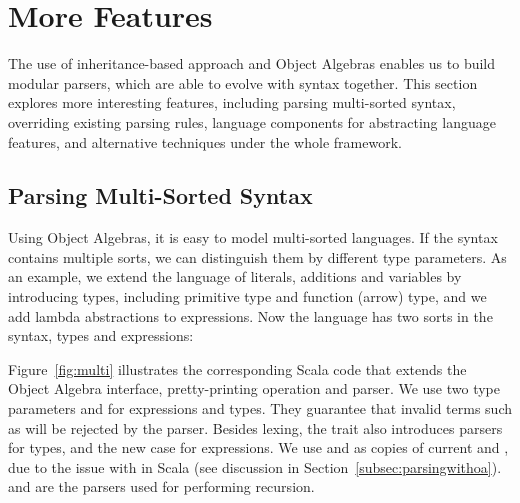 \section{More Features}

The use of inheritance-based approach and Object Algebras enables us
to build modular parsers, which are able to evolve with
syntax together. This section explores more interesting features, including
parsing multi-sorted syntax, overriding existing parsing rules,
language components for abstracting language features, and alternative
techniques under the whole framework.

\subsection{Parsing Multi-Sorted Syntax}\label{subsec:differentsyntax}

\begin{comment}
As illustrated above, using Object Algebras separates data structures from behaviors, thus enabling more modularity and reuse. New language constructs correspond to the new cases in the algebra. Different operations
 on structures, with both code reuse and separate compilation supported.
\end{comment}

Using Object Algebras, it is easy to
model multi-sorted languages. If the syntax contains multiple sorts, we can distinguish them by different type parameters. As an example, we extend the language of literals, additions and variables by introducing types, including primitive type  and function (arrow) type, and we add lambda abstractions to expressions. Now the language has two sorts in the syntax, types and expressions:\\


Figure~\ref{fig:multi} illustrates the corresponding Scala code
that extends the Object Algebra interface, pretty-printing operation and parser. We use two type parameters  and  for expressions and types. They guarantee that invalid terms such as  will be rejected by the parser.
Besides lexing, the trait  also introduces parsers for types, and the new case for expressions.
We use  and  as copies of current  and , due to the issue
with  in Scala (see discussion in Section~\ref{subsec:parsingwithoa}).  and  are the parsers used for performing recursion.

